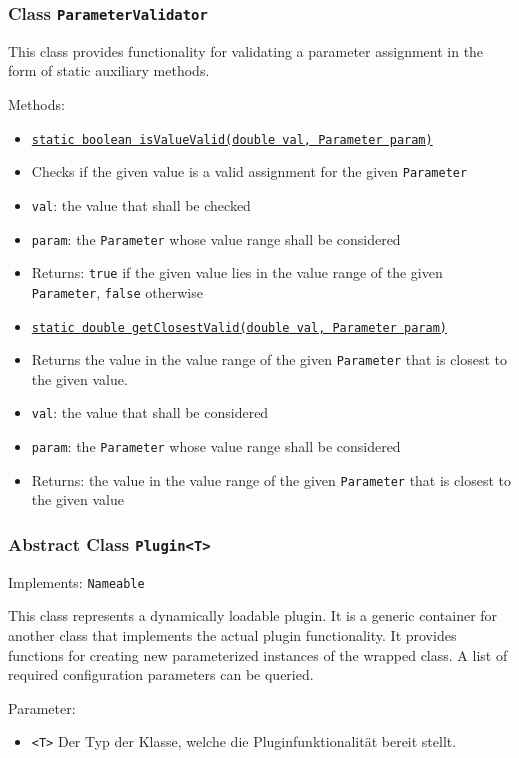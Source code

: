 \documentclass[parskip=full,11pt]{scrartcl}
\begin{document}
\subsubsection{Class \texttt{ParameterValidator}}

This class provides functionality for validating a parameter assignment in the form of static auxiliary methods.

Methods:

\begin{itemize} \itemsep -10pt
	\item \underline{\texttt{static boolean isValueValid(double val, Parameter param)}}
	\item[] Checks if the given value is a valid assignment for the given \texttt{Parameter}
	\item[] \texttt{val}: the value that shall be checked
	\item[] \texttt{param}: the \texttt{Parameter} whose value range shall be considered
	\item[] Returns: \texttt{true} if the given value lies in the value range of the given \texttt{Parameter}, \texttt{false} otherwise
	\item \underline{\texttt{static double getClosestValid(double val, Parameter param)}}
	\item[] Returns the value in the value range of the given \texttt{Parameter} that is closest to the given value.
	\item[] \texttt{val}: the value that shall be considered
	\item[] \texttt{param}: the \texttt{Parameter} whose value range shall be considered
	\item[] Returns: the value in the value range of the given \texttt{Parameter} that is closest to the given value
\end{itemize}

\subsubsection{Abstract Class \texttt{Plugin<T>}}
Implements: \texttt{Nameable}

This class represents a dynamically loadable plugin. It is a generic container for another class that implements the actual plugin functionality. It provides functions for creating new parameterized instances of the wrapped class. A list of required configuration parameters can be queried.

Parameter:
\begin{itemize}\itemsep -10pt
	\item \texttt{<T>} Der Typ der Klasse, welche die Pluginfunktionalität bereit stellt. 
\end{itemize}
\end{document}
